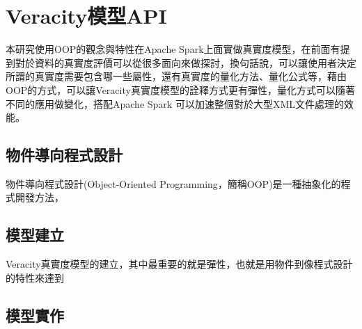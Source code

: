\section{Veracity模型API}
本研究使用OOP的觀念與特性在Apache Spark上面實做真實度模型，在前面有提到對於資料的真實度評價可以從很多面向來做探討，換句話說，可以讓使用者決定所謂的真實度需要包含哪一些屬性，還有真實度的量化方法、量化公式等，藉由OOP的方式，可以讓Veracity真實度模型的詮釋方式更有彈性，量化方式可以隨著不同的應用做變化，搭配Apache Spark 可以加速整個對於大型XML文件處理的效能。
\subsection{物件導向程式設計}
物件導向程式設計(Object-Oriented Programming，簡稱OOP)是一種抽象化的程式開發方法，
\subsection{模型建立}
Veracity真實度模型的建立，其中最重要的就是彈性，也就是用物件到像程式設計的特性來達到
\subsection{模型實作}